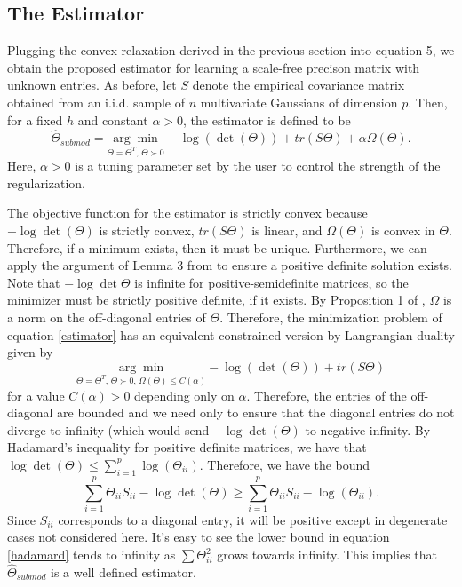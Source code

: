 \documentclass{uwstat572}
\theoremstyle{remark}
\theoremstyle{definition}
\begin{document}
\subsection{The Estimator}

Plugging the convex relaxation derived in the previous section into equation 5, we obtain the proposed estimator for learning a scale-free precison matrix with unknown entries.  As before, let $S$ denote the empirical covariance matrix obtained from an i.i.d. sample of $n$ multivariate Gaussians of dimension $p$.  Then, for a fixed $h$ and constant $\alpha > 0$, the estimator is defined to be
\begin{equation}\label{estimator}
\widehat{\Theta}_{submod} = \underset{\Theta = \Theta^T, \, \Theta \succ 0}{\arg \min} - \log(\det(\Theta)) + tr(S \Theta) + \alpha \Omega(\Theta).
\end{equation}
Here, $\alpha > 0$ is a tuning parameter set by the user to control the strength of the regularization.  

The objective function for the estimator is strictly convex because $- \log \det(\Theta)$ is strictly convex, $tr(S \Theta)$ is linear, and $\Omega(\Theta)$ is convex in $\Theta$.  Therefore, if a minimum exists, then it must be unique.  Furthermore, we can apply the argument of Lemma 3 from \cite{ravikumar2011} to ensure a positive definite solution exists.  Note that $- \log \det \Theta$ is infinite for positive-semidefinite matrices, so the minimizer must be strictly positive definite, if it exists.  By Proposition 1 of \cite{bach2010}, $\Omega$ is a norm on the off-diagonal entries of $\Theta$.  Therefore, the minimization problem of equation \eqref{estimator} has an equivalent constrained version by Langrangian duality given by
\begin{equation}
\underset{\Theta = \Theta^T, \, \Theta \succ 0, \, \Omega(\Theta) \leq C(\alpha)}{\arg \min} - \log(\det(\Theta)) + tr(S \Theta)
\end{equation}
for a value $C(\alpha) > 0$ depending only on $\alpha$. Therefore, the entries of the off-diagonal are bounded and we need only to ensure that the diagonal entries do not diverge to infinity (which would send $- \log \det (\Theta)$ to negative infinity.  By Hadamard's inequality for positive definite matrices, we have that $\log \det (\Theta) \leq \sum_{i=1}^p \log (\Theta_{ii})$.  Therefore, we have the bound
\begin{equation}\label{hadamard}
\sum_{i=1}^p \Theta_{ii} S_{ii} - \log \det (\Theta) \geq \sum_{i=1}^p\Theta_{ii} S_{ii} - \log (\Theta_{ii}).
\end{equation}
Since $S_{ii}$ corresponds to a diagonal entry, it will be positive except in degenerate cases not considered here.  It's easy to see the lower bound in equation \eqref{hadamard} tends to infinity as $\sum \Theta_{ii}^2$ grows towards infinity.  This implies that $\widehat{\Theta}_{submod}$ is a well defined estimator.
\end{document}
